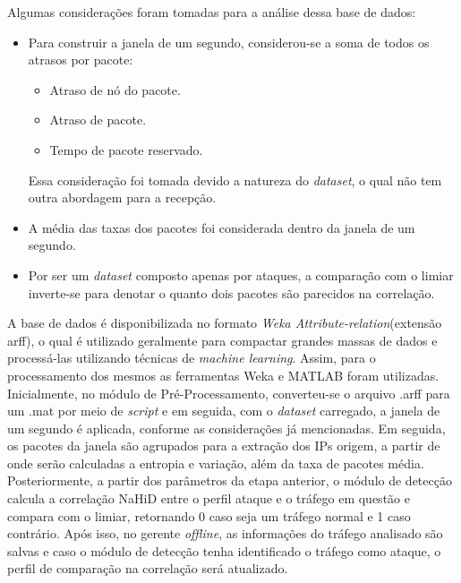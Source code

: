 Algumas considerações foram tomadas para a análise dessa base de dados:
\begin{itemize}
	\item Para construir a janela de um segundo, considerou-se a soma de todos os atrasos por pacote:
	\begin{itemize}
	 \item Atraso de nó do pacote.
	 \item  Atraso de pacote.
	 \item Tempo de pacote reservado.
	\end{itemize}
	Essa consideração foi tomada devido a natureza do \textit{dataset}, o qual não tem outra abordagem para a recepção.
	\item A média das taxas dos pacotes foi considerada dentro da janela de um segundo.
	\item Por ser um \textit{dataset} composto apenas por ataques, a comparação com o limiar inverte-se para denotar o quanto dois pacotes são parecidos na correlação.
\end{itemize}

A base de dados é disponibilizada no formato \textit{Weka Attribute-relation}(extensão arff), o qual é utilizado geralmente para compactar grandes massas de dados e processá-las utilizando técnicas de \textit{machine learning}. Assim, para o processamento dos mesmos as ferramentas Weka e MATLAB foram utilizadas. Inicialmente, no módulo de Pré-Processamento, converteu-se o arquivo .arff para um .mat por meio de \textit{script} e em seguida, com o \textit{dataset} carregado, a janela de um segundo é aplicada, conforme as considerações já mencionadas. Em seguida, os pacotes da janela são agrupados para a extração dos IPs origem, a partir de onde serão calculadas a entropia e  variação, além da taxa de pacotes média. Posteriormente, a partir dos parâmetros da etapa anterior, o módulo de detecção calcula a correlação NaHiD entre o perfil ataque e o tráfego em questão e compara com o limiar, retornando 0 caso seja um tráfego normal e 1 caso contrário. Após isso, no gerente \textit{offline}, as informações do tráfego analisado são salvas e caso o módulo de detecção tenha identificado o tráfego como ataque, o perfil de comparação na correlação será atualizado.

